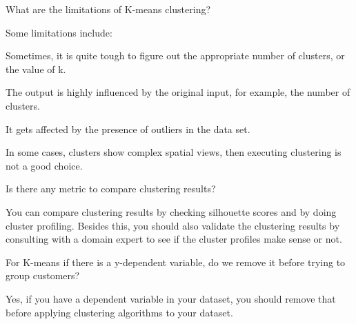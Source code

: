	\begin{qanda}
		\begin{question}
What are the limitations of K-means clustering?
		\end{question}

		\begin{answer}
Some limitations include:
	\begin{bulletedlist}
		\item Sometimes, it is quite tough to figure out the appropriate number of clusters, or the value of k.
		\item The output is highly influenced by the original input, for example, the number of clusters.
		\item It gets affected by the presence of outliers in the data set.
		\item In some cases, clusters show complex spatial views, then executing clustering is not a good choice.
	\end{bulletedlist}
		\end{answer}
	\end{qanda}

	\begin{qanda}
		\begin{question}
Is there any metric to compare clustering results?
		\end{question}

		\begin{answer}
You can compare clustering results by checking silhouette scores and by doing cluster profiling. Besides this, you should also validate the clustering results by consulting with a domain expert to see if the cluster profiles make sense or not.
		\end{answer}
	\end{qanda}


	\begin{qanda}
		\begin{question}
For K-means if there is a y-dependent variable, do we remove it before trying to group customers?
		\end{question}

		\begin{answer}
Yes, if you have a dependent variable in your dataset, you should remove that before applying clustering algorithms to your dataset.
		\end{answer}
	\end{qanda}

